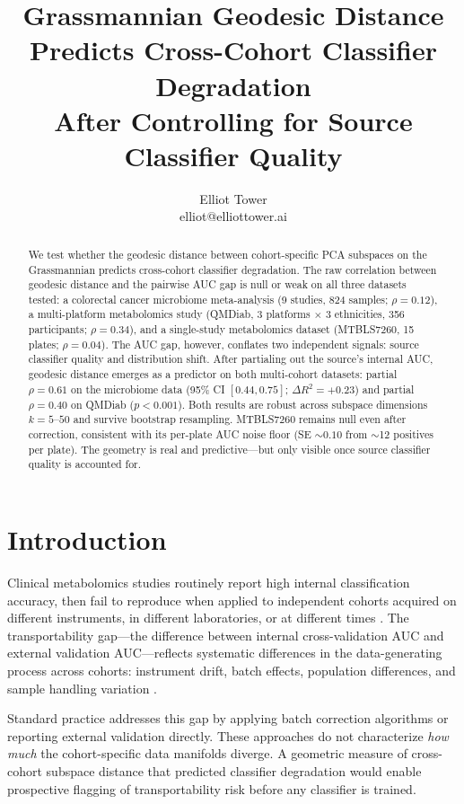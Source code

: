 \documentclass{article}
\title{Grassmannian Geodesic Distance Predicts Cross-Cohort Classifier Degradation\\After Controlling for Source Classifier Quality}
\author{\name Elliot Tower \\
      \email elliot@elliottower.ai}
\begin{document}
\maketitle

\begin{abstract}
We test whether the geodesic distance between cohort-specific PCA subspaces on the Grassmannian predicts cross-cohort classifier degradation. The raw correlation between geodesic distance and the pairwise AUC gap is null or weak on all three datasets tested: a colorectal cancer microbiome meta-analysis (9 studies, 824 samples; $\rho = 0.12$), a multi-platform metabolomics study (QMDiab, 3 platforms $\times$ 3 ethnicities, 356 participants; $\rho = 0.34$), and a single-study metabolomics dataset (MTBLS7260, 15 plates; $\rho = 0.04$). The AUC gap, however, conflates two independent signals: source classifier quality and distribution shift. After partialing out the source's internal AUC, geodesic distance emerges as a predictor on both multi-cohort datasets: partial $\rho = 0.61$ on the microbiome data (95\% CI $[0.44, 0.75]$; $\Delta R^2 = +0.23$) and partial $\rho = 0.40$ on QMDiab ($p < 0.001$). Both results are robust across subspace dimensions $k = 5$--$50$ and survive bootstrap resampling. MTBLS7260 remains null even after correction, consistent with its per-plate AUC noise floor (SE $\sim 0.10$ from $\sim$12 positives per plate). The geometry is real and predictive---but only visible once source classifier quality is accounted for.
\end{abstract}

\section{Introduction}

Clinical metabolomics studies routinely report high internal classification accuracy, then fail to reproduce when applied to independent cohorts acquired on different instruments, in different laboratories, or at different times \citep{broadhurst2006statistical}. The transportability gap---the difference between internal cross-validation AUC and external validation AUC---reflects systematic differences in the data-generating process across cohorts: instrument drift, batch effects, population differences, and sample handling variation \citep{wehrens2016improved}.

Standard practice addresses this gap by applying batch correction algorithms \citep{johnson2007adjusting} or reporting external validation directly. These approaches do not characterize \emph{how much} the cohort-specific data manifolds diverge. A geometric measure of cross-cohort subspace distance that predicted classifier degradation would enable prospective flagging of transportability risk before any classifier is trained.
\end{document}
